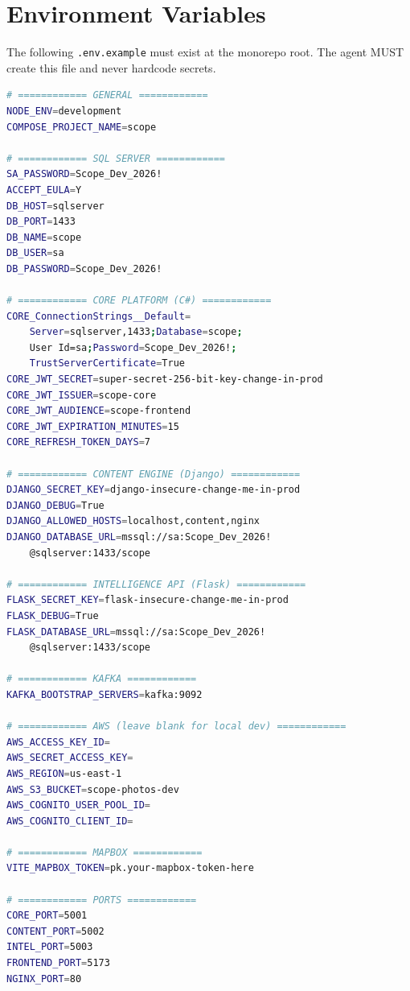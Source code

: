 \documentclass[12pt,letterpaper]{article}
\begin{document}
\newpage

\section{Environment Variables}

The following \texttt{.env.example} must exist at the monorepo root. The agent MUST create this file and never hardcode secrets.

\begin{lstlisting}[style=code,language=bash]
# ============ GENERAL ============
NODE_ENV=development
COMPOSE_PROJECT_NAME=scope

# ============ SQL SERVER ============
SA_PASSWORD=Scope_Dev_2026!
ACCEPT_EULA=Y
DB_HOST=sqlserver
DB_PORT=1433
DB_NAME=scope
DB_USER=sa
DB_PASSWORD=Scope_Dev_2026!

# ============ CORE PLATFORM (C#) ============
CORE_ConnectionStrings__Default=
    Server=sqlserver,1433;Database=scope;
    User Id=sa;Password=Scope_Dev_2026!;
    TrustServerCertificate=True
CORE_JWT_SECRET=super-secret-256-bit-key-change-in-prod
CORE_JWT_ISSUER=scope-core
CORE_JWT_AUDIENCE=scope-frontend
CORE_JWT_EXPIRATION_MINUTES=15
CORE_REFRESH_TOKEN_DAYS=7

# ============ CONTENT ENGINE (Django) ============
DJANGO_SECRET_KEY=django-insecure-change-me-in-prod
DJANGO_DEBUG=True
DJANGO_ALLOWED_HOSTS=localhost,content,nginx
DJANGO_DATABASE_URL=mssql://sa:Scope_Dev_2026!
    @sqlserver:1433/scope

# ============ INTELLIGENCE API (Flask) ============
FLASK_SECRET_KEY=flask-insecure-change-me-in-prod
FLASK_DEBUG=True
FLASK_DATABASE_URL=mssql://sa:Scope_Dev_2026!
    @sqlserver:1433/scope

# ============ KAFKA ============
KAFKA_BOOTSTRAP_SERVERS=kafka:9092

# ============ AWS (leave blank for local dev) ============
AWS_ACCESS_KEY_ID=
AWS_SECRET_ACCESS_KEY=
AWS_REGION=us-east-1
AWS_S3_BUCKET=scope-photos-dev
AWS_COGNITO_USER_POOL_ID=
AWS_COGNITO_CLIENT_ID=

# ============ MAPBOX ============
VITE_MAPBOX_TOKEN=pk.your-mapbox-token-here

# ============ PORTS ============
CORE_PORT=5001
CONTENT_PORT=5002
INTEL_PORT=5003
FRONTEND_PORT=5173
NGINX_PORT=80
\end{lstlisting}
\end{document}

